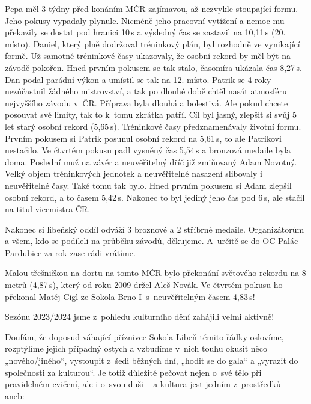 \documentclass[11pt]{article}
\begin{document}
Pepa měl 3 týdny před konáním MČR zajímavou, až nezvykle stoupající formu. Jeho pokusy vypadaly plynule. Nicméně jeho pracovní vytížení a nemoc mu překazily se dostat pod hranici 10\,s a výsledný čas se zastavil na 10,11\,s (20. místo). Daniel, který plně dodržoval tréninkový plán, byl rozhodně ve vynikající formě. Už samotné tréninkové časy ukazovaly, že osobní rekord by měl být na závodě pokořen. Hned prvním pokusem se tak stalo, časomíra ukázala čas 8,27\,s. Dan podal parádní výkon a umístil se tak na 12. místo. Patrik se 4 roky nezúčastnil žádného mistrovství, a tak po dlouhé době chtěl nasát atmosféru nejvyššího závodu v~ČR. Příprava byla dlouhá a bolestivá. Ale pokud chcete posouvat své limity, tak to k~tomu zkrátka patří. Cíl byl jasný, zlepšit si svůj 5 let starý osobní rekord (5,65\,s). Tréninkové časy předznamenávaly životní formu. Prvním pokusem si Patrik posunul osobní rekord na 5,61\,s, to ale Patrikovi nestačilo.  Ve čtvrtém pokusu padl vysněný čas 5,54\,s a bronzová medaile byla doma. Poslední muž na závěr a neuvěřitelný dříč již zmiňovaný Adam Novotný. Velký objem tréninkových jednotek a neuvěřitelné nasazení slibovaly i neuvěřitelné časy. Také tomu tak bylo. Hned prvním pokusem si Adam zlepšil osobní rekord, a to časem 5,42\,s. Nakonec to byl jediný jeho čas pod 6\,s, ale stačil na titul vicemistra ČR.

Nakonec si libeňský oddíl odváží 3 broznové a 2 stříbrné medaile. Organizátorům a všem, kdo se podíleli na průběhu závodů, děkujeme. A~určitě se do OC Palác Pardubice za rok zase rádi vrátíme.

Malou třešničkou na dortu na tomto MČR bylo překonání světového rekordu na 8 metrů (4,87\,s), který od roku 2009 držel Aleš Novák.  Ve čtvrtém pokusu ho překonal Matěj Cigl ze Sokola Brno I~s~neuvěřitelným časem 4,83\,s!

\signature{Patrik Valut}

\vspace*{24pt}

Sezónu 2023/2024 jsme z~pohledu kulturního dění zahájili velmi aktivně!

Doufám, že doposud váhající příznivce Sokola Libeň těmito řádky oslovíme, rozptýlíme jejich případný ostych a vzbudíme v~nich touhu okusit něco „nového/jiného“, vystoupit z~šedi běžných dní, „hodit se do gala“ a „vyrazit do společnosti za kulturou“. Je totiž důležité pečovat nejen o~své tělo při pravidelném cvičení, ale i o~svou duši – a kultura jest jedním z~prostředků – aneb:
\end{document}

